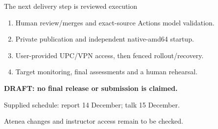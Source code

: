 \documentclass[aspectratio=169,12pt]{beamer}
\begin{document}
\begin{frame}{The next delivery step is reviewed execution}
\begin{enumerate}
\item Human review/merges and exact-source Actions model validation.
\item Private publication and independent native-amd64 startup.
\item User-provided UPC/VPN access, then fenced rollout/recovery.
\item Target monitoring, final assessments and a human rehearsal.
\end{enumerate}
\vspace{.3cm}
\textbf{DRAFT: no final release or submission is claimed.}\par
{\small Supplied schedule: report 14 December; talk 15 December.\par
Atenea changes and instructor access remain to be checked.}
\end{frame}
\end{document}
